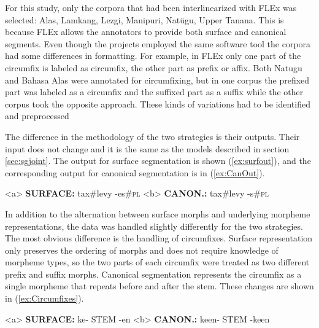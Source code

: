 For this study, only the corpora that had been interlinearized with FLEx was selected:  Alas, Lamkang, Lezgi, Manipuri, Nat\"ugu, Upper Tanana. This is because FLEx allows the annotators to provide both surface and canonical segments.
Even though the projects employed the same software tool the corpora had some differences in formatting. For example, in FLEx only one part of the circumfix is labeled as circumfix, the other part as prefix or affix. Both Natugu and Bahasa Alas were annotated for circumfixing, but in one corpus the prefixed part was labeled as a circumfix and the suffixed part as a suffix while the other corpus took the opposite approach. These kinds of variations had to be identified and preprocessed

The difference in the methodology of the two strategies is their outputs. Their input does not change and it is the same as the models described in section \ref{sec:sgjoint}. The output for surface segmentation is shown (\ref{ex:surfout}), and the corresponding output for canonical segmentation is in (\ref{ex:CanOut}).

\pex   
\label{ex:CanInOut}
\a<a> \textbf{SURFACE:} \hspace{2 mm} tax\#levy \hspace{3 mm} -es\#\textsc{pl}
\label{ex:surfout}
\a<b> \textbf{CANON.:} \hspace{4 mm} tax\#levy \hspace{3 mm} -s\#\textsc{pl} 
\label{ex:CanOut}
\xe

In addition to the alternation between surface morphs and underlying morpheme representations, the data was handled slightly differently for the two strategies. The most obvious difference is the handling of circumfixes. Surface representation only preserves the ordering of morphs and does not require knowledge of morpheme types, so the two parts of each circumfix were treated as two different prefix and suffix morphs.  Canonical segmentation represents the circumfix as a single morpheme that repeats before and after the stem. These changes are shown in (\ref{ex:Circumfixes}).

\pex   
\label{ex:Circumfixes}
\a<a> \textbf{SURFACE:} \hspace{2 mm} ke- \hspace{4 mm}  STEM  \hspace{1 mm} -en
\label{ex:circumsurf}
\a<b> \textbf{CANON.:} \hspace{1 mm} ke\textlangle{}\textrangle{}en- \hspace{1 mm} STEM \hspace{1 mm} -ke\textlangle{}\textrangle{}en
\label{ex:circumcan}
\xe

